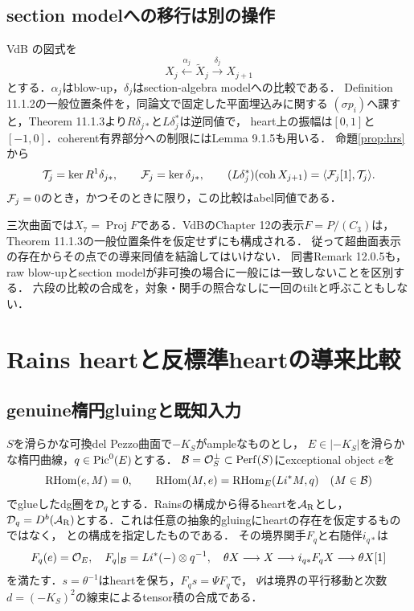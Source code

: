 \subsection{section modelへの移行は別の操作}
VdB \cite[\S11.1]{VdB}の図式を
\[
X_j\xleftarrow{\alpha_j}\widetilde X_j\xrightarrow{\delta_j}X_{j+1}
\]
とする．$\alpha_j$はblow-up，$\delta_j$はsection-algebra modelへの比較である．
Definition 11.1.2の一般位置条件を，同論文で固定した平面埋込みに関する
$(\sigma p_i)$へ課すと，Theorem 11.1.3より$R\delta_{j*}$と$L\delta_j^*$は逆同値で，
heart上の振幅は$[0,1]$と$[-1,0]$．coherent有界部分への制限にはLemma 9.1.5も用いる．
命題\ref{prop:hrs}から
\[
\mathcal T_j=\ker R^1\delta_{j*},\qquad \mathcal F_j=\ker\delta_{j*},\qquad
(L\delta_j^*)(\operatorname{coh} X_{j+1})=\langle\mathcal F_j[1],\mathcal T_j\rangle.
\]
$\mathcal F_j=0$のとき，かつそのときに限り，この比較はabel同値である．

三次曲面では$X_7=\operatorname{Proj}F$である．VdBのChapter 12の表示$F=P/(C_3)$は，
Theorem 11.1.3の一般位置条件を仮定せずにも構成される．
従って超曲面表示の存在からその点での導来同値を結論してはいけない．
同書Remark 12.0.5も，raw blow-upとsection modelが非可換の場合に一般には一致しないことを区別する．
六段の比較の合成を，対象・関手の照合なしに一回のtiltと呼ぶこともしない．

\section{Rains heartと反標準heartの導来比較}\label{sec:Rac}
\subsection{genuine楕円gluingと既知入力}
$S$を滑らかな可換del Pezzo曲面で$-K_S$がampleなものとし，
$E\in|-K_S|$を滑らかな楕円曲線，$q\in\operatorname{Pic}^0(E)$とする．
$\mathcal B=\mathcal O_S^\perp\subset\operatorname{Perf}(S)$にexceptional object $e$を
\begin{equation}\label{eq:glue}
\operatorname{RHom}(e,M)=0,\qquad \operatorname{RHom}(M,e)=\operatorname{RHom}_E(Li^*M,q)
\quad(M\in\mathcal B)
\end{equation}
でglueしたdg圏を$\mathcal D_q$とする．Rainsの構成から得るheartを$\mathcal A_{\mathrm R}$とし，
$\mathcal D_q=D^b(\mathcal A_{\mathrm R})$とする．これは任意の抽象的gluingにheartの存在を仮定するものではなく，
\cite[Theorem 4.30, \S5]{Rains}と\cite[\S4]{Filtered}の構成を指定したものである．
その境界関手$F_q$と右随伴$i_{q*}$は
\[
F_q(e)=\mathcal O_E,\quad F_q|_{\mathcal B}=Li^*(-)\otimes q^{-1},\quad
\theta X\longrightarrow X\longrightarrow i_{q*}F_qX\longrightarrow\theta X[1]
\]
を満たす．$s=\theta^{-1}$はheartを保ち，$F_qs=\Psi F_q$で，
$\Psi$は境界の平行移動と次数$d=(-K_S)^2$の線束によるtensor積の合成である．

